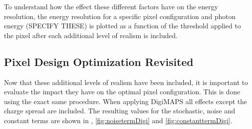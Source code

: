 To understand how the effect these different factors have on the energy resolution, the energy resolution for a specific pixel configuration and photon energy (SPECIFY THESE) is plotted as a function of the threshold applied to the pixel after each additional level of realism is included.

\subsection{Pixel Design Optimization Revisited}

Now that these additional levels of realism have been included, it is important to evaluate the impact they have on the optimal pixel configuration. This is done using the exact same procedure. When applying DigiMAPS all effects except the charge spread are included. The resulting values for the stochastic, noise and constant terms are shown in , \ref{fig:noisetermDigi} and \ref{fig:constanttermDigi}.

